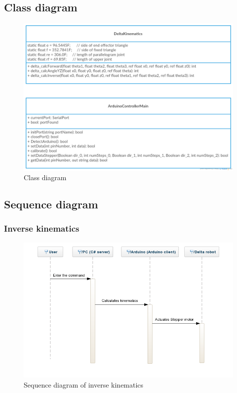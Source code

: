 \subsection{Class diagram}
\begin{figure}[H]
	\centering
	\includegraphics[width=\maxwidth{15cm}, keepaspectratio]{Chapters/Fig/class_diagram.png}
	\caption{Class diagram}
	\label{fig:class_diagram}
\end{figure}

\subsection{Sequence diagram}
\subsubsection{Inverse kinematics}
\begin{figure}[H]
	\centering
	\includegraphics[width=\maxwidth{15cm}, keepaspectratio]{Chapters/Fig/inverse_kinematics_sequence_diagram.png}
	\caption{Sequence diagram of inverse kinematics}
	\label{fig:inverse_kinematics_sequence_diagram}
\end{figure}

